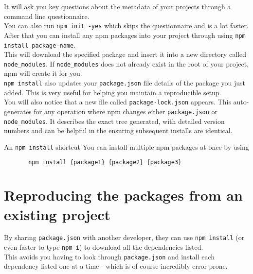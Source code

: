 It will ask you key questions about the metadata of your projects through a command line questionnaire.
\\

You can also run \texttt{npm init -yes} which skips the questionnaire and is a lot faster.
\\

After that you can install any npm packages into your project through using \texttt{npm install package-name}.
\\

This will download the specified package and insert it into a new directory called \texttt{node\_modules}. If \texttt{node\_modules} does not already exist in the root of your project, npm will create it for you.
\\

\texttt{npm install} also updates your \texttt{package.json} file details of the package you just added. This is very useful for helping you maintain a reproducible setup.
\\

You will also notice that a new file called \texttt{package-lock.json} appears. This auto-generates for any operation where npm changes either \texttt{package.json} or \texttt{node\_modules}. It describes the exact tree generated, with detailed version numbers and can be helpful in the ensuring subsequent installs are identical. 
\\

\begin{infobox}{An \texttt{npm install} shortcut}
	You can install multiple npm packages at once by using 
	
	\begin{verbatim}
       npm install {package1} {package2} {package3}
	\end{verbatim}
\end{infobox}


\section{Reproducing the packages from an existing project}

By sharing \texttt{package.json} with another developer, they can use \texttt{npm install} (or even faster to type \texttt{npm i}) to download all the dependencies listed.   
\\

This avoids you having to look through \texttt{package.json} and install each dependency listed one at a time - which is of course incredibly error prone.


